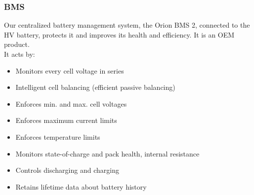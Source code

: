 \subsubsection{BMS}
Our centralized battery management system, the Orion BMS 2, connected to the HV battery, protects it and improves its health and efficiency.
It is an OEM product. \\
It acts by: \begin{itemize}
    \item Monitors every cell voltage in series
    \item Intelligent cell balancing (efficient passive
    balancing)
    \item Enforces min. and max. cell voltages
    \item Enforces maximum current limits
    \item Enforces temperature limits
    \item Monitors state-of-charge and pack health, internal resistance
    \item Controls discharging and charging
    \item Retains lifetime data about battery history
\end{itemize}
